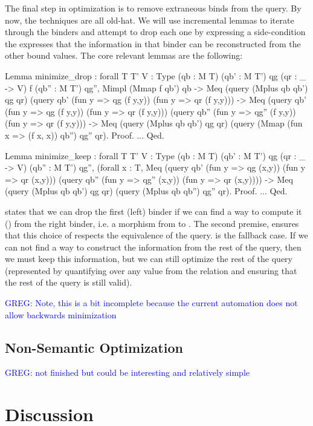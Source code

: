 \documentclass[preprint]{sigplanconf}
\newcommand{\greg}[1]{\textcolor{blue}{GREG: #1}}
\begin{document}
The final step in optimization is to remove extraneous binds from the query.
By now, the techniques are all old-hat.
We will use incremental lemmas to iterate through the binders and attempt to drop each one by expressing a side-condition the expresses that the information in that binder can be reconstructed from the other bound values.
The core relevant lemmas are the following:
\begin{coq}
Lemma minimize_drop
: forall {T T' V : Type} (qb : M T) (qb' : M T') qg (qr : _ -> V) f (qb'' : M T') qg'',
  Mimpl (Mmap f qb') qb ->
  Meq (query (Mplus qb qb') qg qr)
      (query qb' (fun y => qg (f y,y)) (fun y => qr (f y,y))) ->
  Meq (query qb' (fun y => qg (f y,y)) (fun y => qr (f y,y)))
      (query qb'' (fun y => qg'' (f y,y)) (fun y => qr (f y,y))) ->
  Meq (query (Mplus qb qb') qg qr)
      (query (Mmap (fun x => (f x, x)) qb'') qg'' qr).
Proof. ... Qed.

Lemma minimize_keep
: forall {T T' V : Type} (qb : M T) (qb' : M T') qg (qr : _ -> V) (qb'' : M T') qg'',
  (forall x : T,
     Meq (query qb' (fun y => qg (x,y)) (fun y => qr (x,y)))
         (query qb'' (fun y => qg'' (x,y)) (fun y => qr (x,y)))) ->
  Meq (query (Mplus qb qb') qg qr)
      (query (Mplus qb qb'') qg'' qr).
Proof. ... Qed.
\end{coq}
 states that we can drop the first (left) binder if we can find a way to compute it () from the right binder, i.e. a morphism from  to .
The second premise, ensures that this choice of  respects the equivalence of the query.
 is the fallback case.
If we can not find a way to construct the information from the rest of the query, then we must keep this information, but we can still optimize the rest of the query (represented by quantifying over any value from the relation and ensuring that the rest of the query is still valid).

\greg{Note, this is a bit incomplete because the current automation does not allow backwards minimization}

\subsection{Non-Semantic Optimization}
\greg{not finished but could be interesting and relatively simple}

\section{Discussion}
\end{document}
